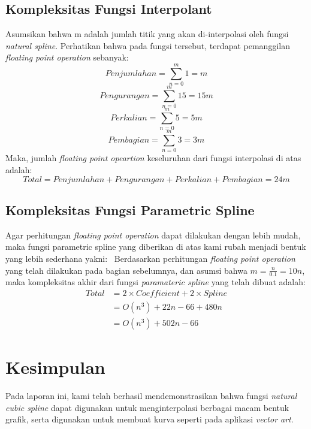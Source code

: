 \documentclass[journal,12pt,onecolumn,a4paper]{IEEEtran}
\begin{document}
\subsection{Kompleksitas Fungsi Interpolant}

Asumsikan bahwa m adalah jumlah titik yang akan di-interpolasi oleh fungsi \emph{natural spline}. Perhatikan bahwa pada fungsi tersebut, terdapat pemanggilan \emph{floating point operation} sebanyak:
\begin{equation}
	Penjumlahan = \sum_{n=0}^{m} 1 = m
\end{equation}
\begin{equation}
	Pengurangan = \sum_{n=0}^{m} 15 = 15m
\end{equation}
\begin{equation}
	Perkalian = \sum_{n=0}^{m} 5 = 5m
\end{equation}
\begin{equation}
	Pembagian = \sum_{n=0}^{m} 3 = 3m
\end{equation}
Maka, jumlah \emph{floating point opeartion} keseluruhan dari fungsi interpolasi di atas adalah:
\begin{equation}
	Total = Penjumlahan + Pengurangan + Perkalian + Pembagian = 24m
\end{equation}

\subsection{Kompleksitas Fungsi Parametric Spline}
Agar perhitungan \emph{floating point operation} dapat dilakukan dengan lebih mudah, maka fungsi parametric spline yang diberikan di atas kami rubah menjadi bentuk yang lebih sederhana yakni:
\
Berdasarkan perhitungan \emph{floating point operation} yang telah dilakukan pada bagian sebelumnya, dan asumsi bahwa \(m = \frac{n}{0.1} = 10n\), maka kompleksitas akhir dari fungsi \emph{paramateric spline} yang telah dibuat adalah:
\begin{equation}
	\begin{split}
		Total & = 2 \times Coefficient + 2 \times Spline\\
		& = O(n^3) + 22n - 66 + 480n\\
		& = O(n^3) + 502n - 66
	\end{split}
\end{equation}
\pagebreak
\section{Kesimpulan}
Pada laporan ini, kami telah berhasil mendemonstrasikan bahwa fungsi \emph{natural cubic spline} dapat digunakan untuk menginterpolasi berbagai macam bentuk grafik, serta digunakan untuk membuat kurva seperti pada aplikasi \emph{vector art}.
\end{document}

